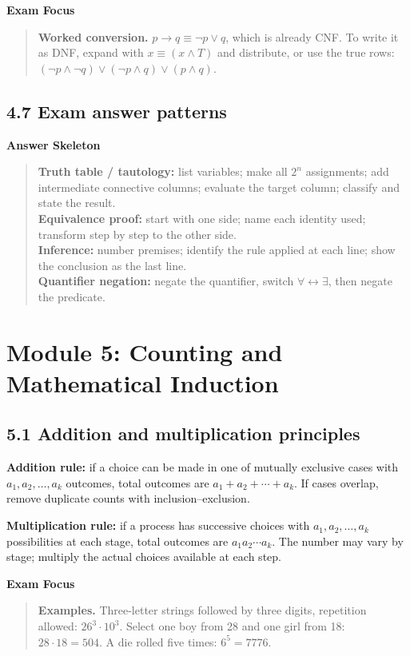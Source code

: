 \documentclass[11pt,a4paper]{article}
\newenvironment{exambox}{\par\medskip\noindent\color{blue}\textbf{Exam Focus}\par\smallskip\color{black}\begin{quote}}{\end{quote}\medskip}
\newenvironment{answerbox}{\par\medskip\noindent\color{green}\textbf{Answer Skeleton}\par\smallskip\color{black}\begin{quote}}{\end{quote}\medskip}
\begin{document}
\begin{exambox}\textbf{Worked conversion.} $p\to q\equiv\neg p\lor q$, which is already CNF. To write it as DNF, expand with $x\equiv(x\land T)$ and distribute, or use the true rows: $(\neg p\land\neg q)\lor(\neg p\land q)\lor(p\land q)$.\end{exambox}

\subsection{4.7 Exam answer patterns}
\begin{answerbox}
\textbf{Truth table / tautology:} list variables; make all $2^n$ assignments; add intermediate connective columns; evaluate the target column; classify and state the result.\\
\textbf{Equivalence proof:} start with one side; name each identity used; transform step by step to the other side.\\
\textbf{Inference:} number premises; identify the rule applied at each line; show the conclusion as the last line.\\
\textbf{Quantifier negation:} negate the quantifier, switch $\forall\leftrightarrow\exists$, then negate the predicate.
\end{answerbox}

\section{Module 5: Counting and Mathematical Induction}

\subsection{5.1 Addition and multiplication principles}
\textbf{Addition rule:} if a choice can be made in one of mutually exclusive cases with $a_1,a_2,\ldots,a_k$ outcomes, total outcomes are $a_1+a_2+\cdots+a_k$. If cases overlap, remove duplicate counts with inclusion--exclusion.

\textbf{Multiplication rule:} if a process has successive choices with $a_1,a_2,\ldots,a_k$ possibilities at each stage, total outcomes are $a_1a_2\cdots a_k$. The number may vary by stage; multiply the actual choices available at each step.

\begin{exambox}\textbf{Examples.} Three-letter strings followed by three digits, repetition allowed: $26^3\cdot10^3$. Select one boy from 28 and one girl from 18: $28\cdot18=504$. A die rolled five times: $6^5=7776$.\end{exambox}
\end{document}
